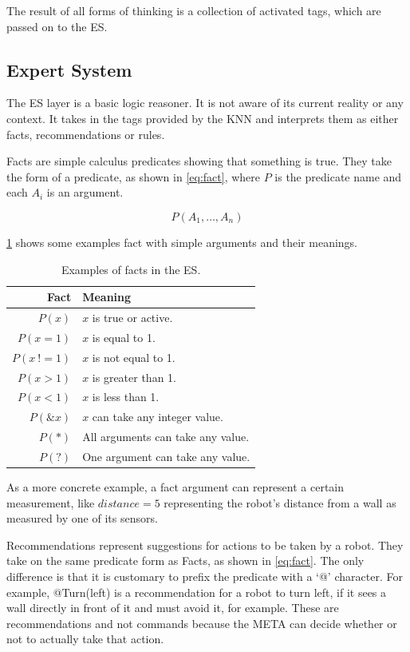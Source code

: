 \documentclass[titlepage,11pt]{article}
\begin{document}
The result of all forms of thinking is a collection of activated tags, which are passed on to the ES.

\subsection{Expert System}

The ES layer is a basic logic reasoner. It is not aware of its current reality or any context. It takes in the tags provided by the KNN and interprets them as either facts, recommendations or rules.

Facts are simple calculus predicates showing that something is true. They take the form of a predicate, as shown in \cref{eq:fact}, where $P$ is the predicate name and each $A_i$ is an argument.

\begin{equation} \label{eq:fact}
	P(A_1, \ldots, A_n)
\end{equation}

\cref{table:fact_predicates} shows some examples fact with simple arguments and their meanings.

\begin{table}[!htb]
	\centering
	\caption{Examples of facts in the ES.}
	\begin{tabular}{r | l}
		\textbf{Fact} & \textbf{Meaning} \\ \hline
		$P(x)$ & $x$ is true or active.\\
		$P(x = 1)$ & $x$ is equal to 1. \\
		$P(x \ != 1)$ & $x$ is not equal to 1. \\
		$P(x > 1)$ & $x$ is greater than 1. \\
		$P(x < 1)$ & $x$ is less than 1. \\
		$P(\&x)$ & $x$ can take any integer value. \\
		$P(*)$ & All arguments can take any value. \\
		$P(?)$ & One argument can take any value. \\
	\end{tabular}
	\label{table:fact_predicates}
\end{table}

As a more concrete example, a fact argument can represent a certain measurement, like $distance = 5$ representing the robot's distance from a wall as measured by one of its sensors.

Recommendations represent suggestions for actions to be taken by a robot. They take on the same predicate form as Facts, as shown in \cref{eq:fact}. The only difference is that it is customary to prefix the predicate with a `@' character. For example, @Turn(left) is a recommendation for a robot to turn left, if it sees a wall directly in front of it and must avoid it, for example. These are recommendations and not commands because the META can decide whether or not to actually take that action.
\end{document}
